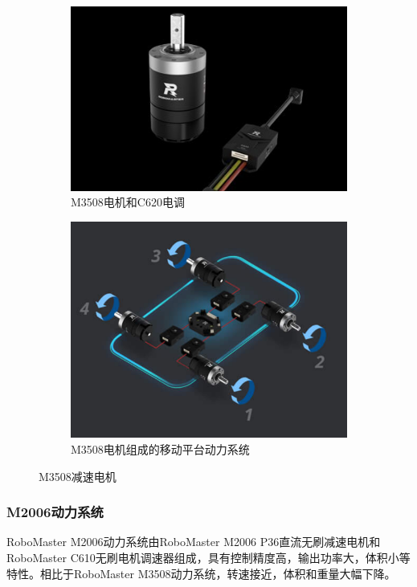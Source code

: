 \documentclass[UTF8]{article} %
\begin{document}
\begin{figure}[H]
  \centering
  \begin{subfigure}[b]{0.4\textwidth}
         \centering
         \includegraphics[width=\textwidth]{dj3.png}
          \caption{M3508电机和C620电调}
  \end{subfigure}
  \quad
  \begin{subfigure}[b]{0.34\textwidth}
          \centering
          \includegraphics[width=\textwidth]{dj4.png}
          \caption{M3508电机组成的移动平台动力系统}
  \end{subfigure}
  \caption{M3508减速电机}
\end{figure}

\subsubsection{M2006动力系统}
RoboMaster M2006动力系统由RoboMaster M2006 P36直流无刷减速电机和RoboMaster C610无刷电机调速器组成，具有控制精度高，输出功率大，体积小等特性。相比于RoboMaster M3508动力系统，转速接近，体积和重量大幅下降。
\end{document}
